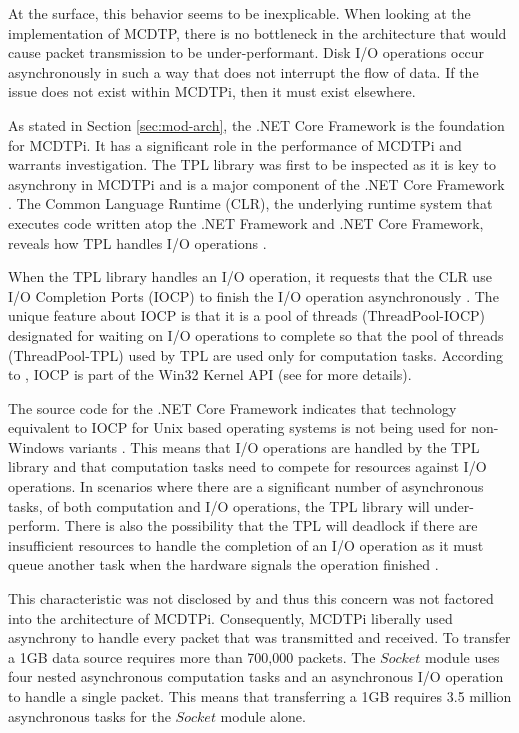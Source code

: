 At the surface, this behavior seems to be inexplicable. When looking at the implementation of MCDTP, there is no bottleneck in the architecture that would cause packet transmission to be under-performant. Disk I/O operations occur asynchronously in such a way that does not interrupt the flow of data. If the issue does not exist within MCDTPi, then it must exist elsewhere.

As stated in Section \ref{sec:mod-arch}, the .NET Core Framework is the foundation for MCDTPi. It has a significant role in the performance of MCDTPi and warrants investigation. The TPL library was first to be inspected as it is key to asynchrony in MCDTPi and is a major component of the .NET Core Framework \cite{Leijen2009,netCore103Src}. The Common Language Runtime (CLR), the underlying runtime system that executes code written atop the .NET Framework and .NET Core Framework, reveals how TPL handles I/O operations \cite{richter2012clr}.

When the TPL library handles an I/O operation, it requests that the CLR use I/O Completion Ports (IOCP) to finish the I/O operation asynchronously \cite{richter2012clr}. The unique feature about IOCP is that it is a pool of threads (ThreadPool-IOCP) designated for waiting on I/O operations to complete so that the pool of threads (ThreadPool-TPL) used by TPL are used only for computation tasks. According to \cite{richter2012clr}, IOCP is part of the Win32 Kernel API (see \cite{netCore103Src} for more details).

The source code for the .NET Core Framework indicates that technology equivalent to IOCP for Unix based operating systems is not being used for non-Windows variants \cite{netCore103Src}. This means that I/O operations are handled by the TPL library and that computation tasks need to compete for resources against I/O operations. In scenarios where there are a significant number of asynchronous tasks, of both computation and I/O operations, the TPL library will under-perform. There is also the possibility that the TPL will deadlock if there are insufficient resources to handle the completion of an I/O operation as it must queue another task when the hardware signals the operation finished \cite{richter2012clr}.

This characteristic was not disclosed by \cite{netCore10,netCore103,netCore103Src} and thus this concern was not factored into the architecture of MCDTPi. Consequently, MCDTPi liberally used asynchrony to handle every packet that was transmitted and received. To transfer a 1GB data source requires more than 700,000 packets. The $Socket$ module uses four nested asynchronous computation tasks and an asynchronous I/O operation to handle a single packet. This means that transferring a 1GB requires 3.5 million asynchronous tasks for the $Socket$ module alone.

